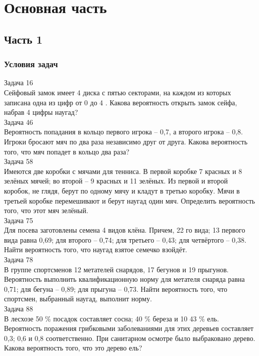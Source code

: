 \chapter{Основная часть}
\section{Часть 1}
\subsection{Условия задач}
Задача 16\\

Сейфовый замок имеет 4 диска с пятью секторами, на
каждом из которых записана одна из цифр от 0 до 4 . Какова
вероятность открыть замок сейфа, набрав 4 цифры наугад?\\


Задача 46\\

Вероятность попадания в кольцо первого игрока – 0,7, а
второго игрока – 0,8. Игроки бросают мяч по два раза независимо друг от друга. Какова вероятность того, что мяч попадет в
кольцо два раза?\\


Задача 58\\

Имеются две коробки с мячами для тенниса. В первой коробке 7 красных и 8 зелёных мячей; во второй – 9 красных и 11
зелёных. Из первой и второй коробок, не глядя, берут по одному
мячу и кладут в третью коробку. Мячи в третьей коробке перемешивают и берут наугад один мяч. Определить вероятность
того, что этот мяч зелёный.\\


Задача 75\\

Для посева заготовлены семена 4 видов клёна. Причем,
22 %
го вида; 13 %
первого вида равна 0,69; для второго – 0,74; для третьего – 0,43;
для четвёртого – 0,38. Найти вероятность того, что наугад взятое
семечко взойдёт.\\


Задача 78\\

В группе спортсменов 12 метателей снарядов, 17 бегунов и
19 прыгунов. Вероятность выполнить квалификационную норму
для метателя снаряда равна 0,71; для бегуна – 0,89; для прыгуна – 0,73. Найти вероятность того, что спортсмен, выбранный
наугад, выполнит норму.\\


Задача 88\\

В лесхозе 50 \% посадок составляет сосна; 40 \% береза и 10 43
\% ель. Вероятность поражения грибковыми заболеваниями для
этих деревьев составляет 0,3; 0,6 и 0,8 соответственно. При санитарном осмотре было выбраковано дерево. Какова вероятность
того, что это дерево ель?\\
